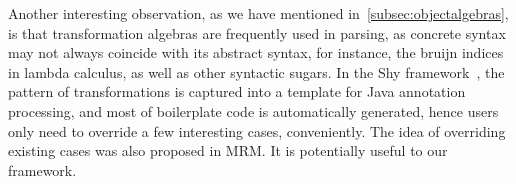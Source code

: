 Another interesting observation, as we have mentioned
in~\ref{subsec:objectalgebras}, is that transformation algebras are
frequently used in parsing, as concrete syntax may not always coincide
with its abstract syntax, for instance, the bruijn indices in lambda
calculus, as well as other syntactic sugars. In the Shy
framework~\cite{Zhang2015}, the pattern of transformations is captured
into a template for Java annotation processing, and most of
boilerplate code is automatically generated, hence users only need to
override a few interesting cases, conveniently. The idea of overriding
existing cases was also proposed in MRM. It is potentially useful to
our framework.
